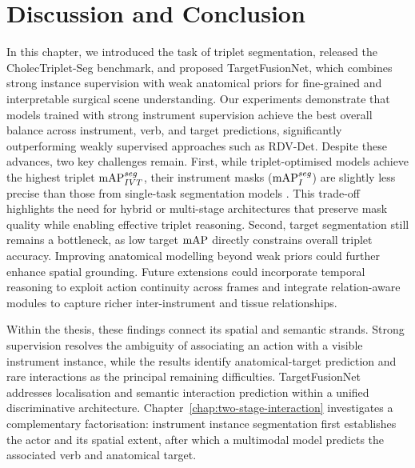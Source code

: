 \section{Discussion and Conclusion}
%
In this chapter, we introduced the task of triplet segmentation, released the CholecTriplet-Seg benchmark, and proposed TargetFusionNet, which combines strong instance supervision with weak anatomical priors for fine-grained and interpretable surgical scene understanding.
%
Our experiments demonstrate that models trained with strong instrument supervision achieve the best overall balance across instrument, verb, and target predictions, significantly outperforming weakly supervised approaches such as RDV-Det.
%
Despite these advances, two key challenges remain.
First, while triplet-optimised models achieve the highest triplet $\textrm{mAP}_{IVT}^{seg}$, their instrument masks ($\textrm{mAP}_{I}^{seg}$) are slightly less precise than those from single-task segmentation models \cite{cholecinstanceseg}.
This trade-off highlights the need for hybrid or multi-stage architectures that preserve mask quality while enabling effective triplet reasoning.
Second, target segmentation still remains a bottleneck, as low target $\textrm{mAP}$ directly constrains overall triplet accuracy. 
Improving anatomical modelling beyond weak priors could further enhance spatial grounding.
Future extensions could incorporate temporal reasoning to exploit action continuity across frames and integrate relation-aware modules to capture richer inter-instrument and tissue relationships.

Within the thesis, these findings connect its spatial and semantic strands. Strong supervision resolves the ambiguity of associating an action with a visible instrument instance, while the results identify anatomical-target prediction and rare interactions as the principal remaining difficulties. TargetFusionNet addresses localisation and semantic interaction prediction within a unified discriminative architecture. Chapter~\ref{chap:two-stage-interaction} investigates a complementary factorisation: instrument instance segmentation first establishes the actor and its spatial extent, after which a multimodal model predicts the associated verb and anatomical target.


